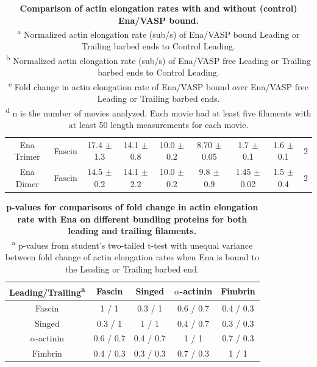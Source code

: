 \begin{table}[hbtp]
\begin{tabulary}{1.0\textwidth}{C C C C C C C C C}
Ena Trimer & Fascin & 17.4 $\pm$1.3 & 14.1 $\pm$0.8 & 10.0\hspace{0.1cm} $\pm$0.2 & 8.70 $\pm$0.05 & 1.7\hspace{0.1cm} $\pm$0.1 & 1.6\hspace{0.1cm} $\pm$0.1 & 2 \\
Ena Dimer & Fascin & 14.5 $\pm$0.2 & 14.1 $\pm$2.2 & 10.0\hspace{0.1cm} $\pm$0.2 & 9.8\hspace{0.3cm} $\pm$0.9 & 1.45 $\pm$0.02 & 1.5\hspace{0.1cm} $\pm$0.4 & 2 \\
\bottomrule
\end{tabulary}
\caption[Comparison of actin elongation rates with and without (control) Ena/VASP bound.]{\textbf{Comparison of actin elongation rates with and without (control) Ena/VASP bound.} \\
   \textsuperscript{a} Normalized actin elongation rate (sub/s) of Ena/VASP bound Leading or Trailing barbed ends to Control Leading.\\
   \textsuperscript{b} Normalized actin elongation rate (sub/s) of Ena/VASP free Leading or Trailing barbed ends to Control Leading.\\
   \textsuperscript{c} Fold change in actin elongation rate of Ena/VASP bound over Ena/VASP free Leading or Trailing barbed ends.\\
   \textsuperscript{d} n is the number of movies analyzed. Each movie had at least five filaments with at least 50 length measurements for each movie.}
\label{tab:ena-elongation}
\end{table}

\begin{table}[!htb]
\centering
\begin{tabular}{ c c c c c }
\toprule 
Leading\slash Trailing\textsuperscript{a} & Fascin & Singed & $\alpha$-actinin & Fimbrin \\
\midrule
Fascin & 1 / 1 & 0.3 / 1 & 0.6 / 0.7 & 0.4 / 0.3 \\
Singed & 0.3 / 1 & 1 / 1 & 0.4 / 0.7 & 0.3 / 0.3 \\
$\alpha$-actinin & 0.6 / 0.7 & 0.4 / 0.7 & 1 / 1 & 0.7 / 0.3 \\
Fimbrin & 0.4 / 0.3 & 0.3 / 0.3 & 0.7 / 0.3 & 1 / 1 \\
\bottomrule
\end{tabular}
\caption[p-values for comparisons of fold change in actin elongation rate with Ena on different bundling proteins for both leading and trailing filaments.]{\textbf{p-values for comparisons of fold change in actin elongation rate with Ena on different bundling proteins for both leading and trailing filaments.} \\
\textsuperscript{a} p-values from student's two-tailed t-test with unequal variance between fold change of actin elongation rates when Ena is bound to the Leading or Trailing barbed end.}
\label{tab:ena-p-elongation-bundlers}
\end{table}

